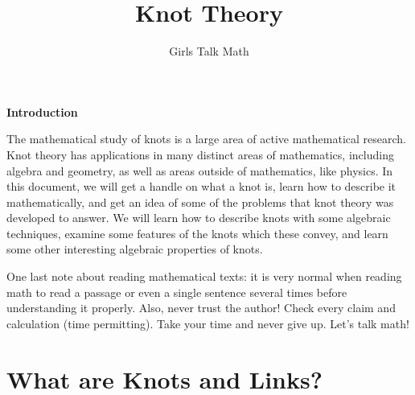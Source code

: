 \documentclass[12 pt]{article}
\title{Knot Theory}
\author{Girls Talk Math}
\date{}
\newcounter{exercise}[section]
\begin{document}
\maketitle
\vskip 1in
\begin{center} \textbf{Introduction} \end{center}
The mathematical study of knots is a large area of active mathematical research. Knot theory has applications in many distinct areas of mathematics, including algebra and geometry, as well as areas outside of mathematics, like physics. In this document, we will get a handle on what a knot is, learn how to describe it mathematically, and get an idea of some of the problems that knot theory was developed to answer. We will learn how to describe knots with some algebraic techniques, examine some features of the knots which these convey, and learn some other interesting algebraic properties of knots.

One last note about reading mathematical texts: it is very normal when reading math to read a passage or even a single sentence several times before understanding it properly. Also, never trust the author! Check every claim and calculation (time permitting). Take your time and never give up. Let's talk math!
	
\newpage

\tableofcontents



\newpage
\section{What are Knots and Links?}
\end{document}
